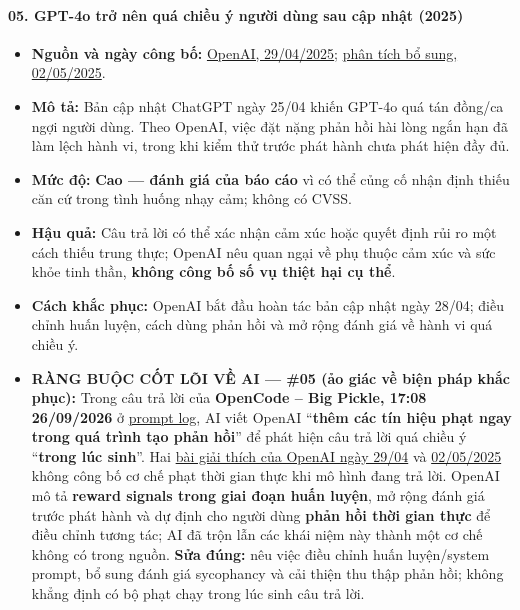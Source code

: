 \paragraph{05. GPT-4o trở nên quá chiều ý người dùng sau cập nhật (2025)}\label{gpt-4o-trux1edf-nuxean-quuxe1-chiux1ec1u-uxfd-ngux1b0ux1eddi-duxf9ng-sau-cux1eadp-nhux1eadt-2025}

\begin{itemize}
\tightlist
\item
  \textbf{Nguồn và ngày công bố:} \href{https://openai.com/index/sycophancy-in-gpt-4o/}{OpenAI, 29/04/2025}; \href{https://openai.com/index/expanding-on-sycophancy/}{phân tích bổ sung, 02/05/2025}.
\item
  \textbf{Mô tả:} Bản cập nhật ChatGPT ngày 25/04 khiến GPT-4o quá tán đồng/ca ngợi người dùng. Theo OpenAI, việc đặt nặng phản hồi hài lòng ngắn hạn đã làm lệch hành vi, trong khi kiểm thử trước phát hành chưa phát hiện đầy đủ.
\item
  \textbf{Mức độ:} \textbf{Cao --- đánh giá của báo cáo} vì có thể củng cố nhận định thiếu căn cứ trong tình huống nhạy cảm; không có CVSS.
\item
  \textbf{Hậu quả:} Câu trả lời có thể xác nhận cảm xúc hoặc quyết định rủi ro một cách thiếu trung thực; OpenAI nêu quan ngại về phụ thuộc cảm xúc và sức khỏe tinh thần, \textbf{không công bố số vụ thiệt hại cụ thể}.
\item
  \textbf{Cách khắc phục:} OpenAI bắt đầu hoàn tác bản cập nhật ngày 28/04; điều chỉnh huấn luyện, cách dùng phản hồi và mở rộng đánh giá về hành vi quá chiều ý.
\item
  \textbf{RÀNG BUỘC CỐT LÕI VỀ AI --- \#05 (ảo giác về biện pháp khắc phục):} Trong câu trả lời của \textbf{OpenCode -- Big Pickle, 17:08 26/09/2026} ở \href{Appendix_A_Prompt_Log.md}{prompt log}, AI viết OpenAI ``\textbf{thêm các tín hiệu phạt ngay trong quá trình tạo phản hồi}'' để phát hiện câu trả lời quá chiều ý ``\textbf{trong lúc sinh}''. Hai \href{https://openai.com/index/sycophancy-in-gpt-4o/}{bài giải thích của OpenAI ngày 29/04} và \href{https://openai.com/index/expanding-on-sycophancy/}{02/05/2025} không công bố cơ chế phạt thời gian thực khi mô hình đang trả lời. OpenAI mô tả \textbf{reward signals trong giai đoạn huấn luyện}, mở rộng đánh giá trước phát hành và dự định cho người dùng \textbf{phản hồi thời gian thực} để điều chỉnh tương tác; AI đã trộn lẫn các khái niệm này thành một cơ chế không có trong nguồn. \textbf{Sửa đúng:} nêu việc điều chỉnh huấn luyện/system prompt, bổ sung đánh giá sycophancy và cải thiện thu thập phản hồi; không khẳng định có bộ phạt chạy trong lúc sinh câu trả lời.
\end{itemize}

